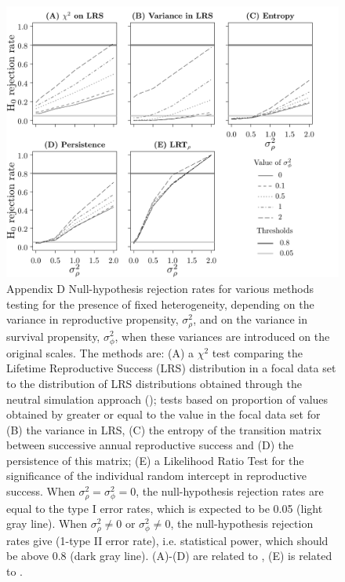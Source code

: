 \begin{figure}[ht]
		\includegraphics[width=\textwidth]{FiguresDynHet/Figure6}
	\caption{Appendix D \footnotesize Null-hypothesis rejection rates for various methods testing for the presence of fixed heterogeneity, depending on the variance in reproductive propensity, $\sigma_{\rho}^2$, and on the variance in survival propensity, $\sigma_{\phi}^2$, when these variances are introduced on the original scales. The methods are: (A) a $\chi^2$ test comparing the Lifetime Reproductive Success (LRS) distribution in a focal data set to the distribution of LRS distributions obtained through the neutral simulation approach (\NSM); tests based on proportion of values obtained by \NSM greater or equal to the value in the focal data set for (B) the variance in LRS, (C) the entropy of the transition matrix between successive annual reproductive success and (D) the persistence of this matrix; (E) a Likelihood Ratio Test for the significance of the individual random intercept in reproductive success. When $\sigma_{\rho}^2 = \sigma_{\phi}^2 = 0$, the null-hypothesis rejection rates are equal to the type I error rates, which is expected to be 0.05 (light gray line). When $\sigma_{\rho}^2 \neq 0$ or $\sigma_{\phi}^2 \neq 0$, the null-hypothesis rejection rates give (1-type II error rate), i.e. statistical power, which should be above 0.8 (dark gray line). (A)-(D) are related to \NSM, (E) is related to \MM.}	
	\label{figure:VarOut}
\end{figure}

